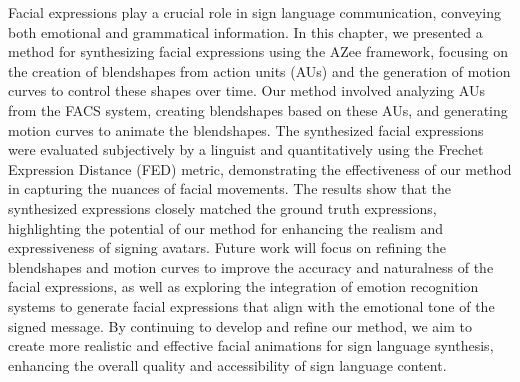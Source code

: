 \documentclass[../../main]{subfiles}
\begin{document}
Facial expressions play a crucial role in sign language communication, conveying both emotional and grammatical information. In this chapter, we presented a method for synthesizing facial expressions using the AZee framework, focusing on the creation of blendshapes from action units (AUs) and the generation of motion curves to control these shapes over time. Our method involved analyzing AUs from the FACS system, creating blendshapes based on these AUs, and generating motion curves to animate the blendshapes. The synthesized facial expressions were evaluated subjectively by a linguist and quantitatively using the Frechet Expression Distance (FED) metric, demonstrating the effectiveness of our method in capturing the nuances of facial movements. The results show that the synthesized expressions closely matched the ground truth expressions, highlighting the potential of our method for enhancing the realism and expressiveness of signing avatars. Future work will focus on refining the blendshapes and motion curves to improve the accuracy and naturalness of the facial expressions, as well as exploring the integration of emotion recognition systems to generate facial expressions that align with the emotional tone of the signed message. By continuing to develop and refine our method, we aim to create more realistic and effective facial animations for sign language synthesis, enhancing the overall quality and accessibility of sign language content.
\end{document}
